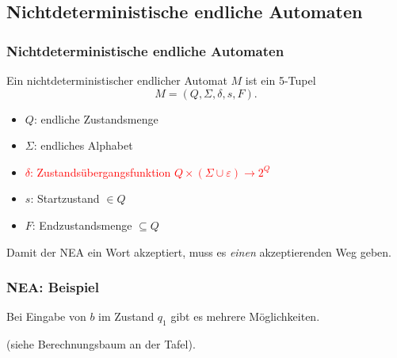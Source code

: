 \subsection{Nichtdeterministische endliche Automaten}
\begin{frame}
\frametitle{Nichtdeterministische endliche Automaten}
        Ein nichtdeterministischer endlicher Automat $M$ ist ein 5-Tupel
        \[
        M= (Q,\Sigma,\delta,s,F).
        \]
        \begin{itemize}
        \item $Q$:  endliche Zustandsmenge
        \item $\Sigma$:    endliches Alphabet
        \item \textcolor{red}{$\delta$:   Zustandsübergangsfunktion $Q\times (\Sigma \cup \varepsilon) \rightarrow 2^Q$}
        \item $s$:   Startzustand $\in Q$
        \item $F$:   Endzustandsmenge $\subseteq Q$
        \end{itemize}
\vspace{0.5cm}
	Damit der NEA ein Wort akzeptiert, muss es \emph{einen} akzeptierenden Weg geben.
\end{frame}
\begin{frame}
	\frametitle{NEA: Beispiel}
	\begin{figure}
	\end{figure}
 	Bei Eingabe von $b$ im Zustand $q_1$ gibt es mehrere Möglichkeiten. \vspace{0.5cm}
	
	(siehe Berechnungsbaum an der Tafel).
\end{frame}
